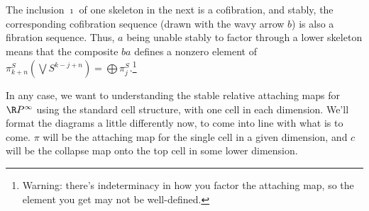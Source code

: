 The inclusion $\imath$ of one skeleton in the next is a cofibration, and stably, the corresponding cofibration sequence (drawn with the wavy arrow $b$) is also a fibration sequence.
Thus, $a$ being unable stably to factor through a lower skeleton means that the composite $ba$ defines a nonzero element of $\pi_{k+n}^S \left( \bigvee S^{k-j+n} \right) = \bigoplus \pi_j^S$.\footnote{Warning: there's indeterminacy in how you factor the attaching map, so the element you get may not be well-defined.}

In any case, we want to understanding the stable relative attaching maps for $\RP^\infty$ using the standard cell structure, with one cell in each dimension. We'll format the diagrams a little differently now, to come into line with what is to come. $\pi$ will be the attaching map for the single cell in a given dimension, and $c$ will be the collapse map onto the top cell in some lower dimension.


